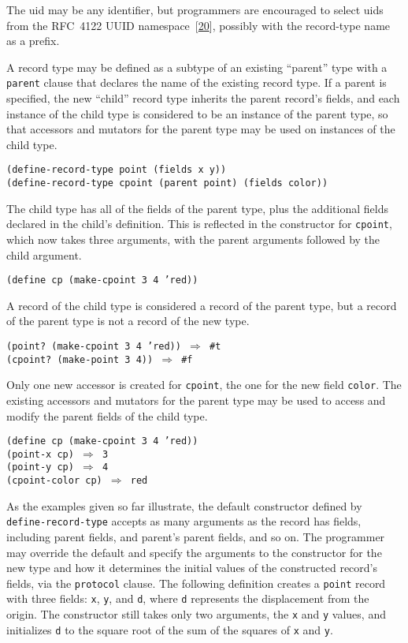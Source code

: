 The uid may be any identifier, but programmers are encouraged to select
uids from the RFC 4122 UUID namespace [\hyperref[bibliography_g238]{20}], possibly with the
record-type name as a prefix.


\label{records_s7}\label{records_s8}\label{records_s9}\label{records_s10}\label{records_page_parent_type}A record type may be defined as a subtype of an existing ``parent'' type
with a \texttt{parent} clause that declares the name of the existing
record type.
If a parent is specified, the new ``child'' record type inherits the
parent record's fields, and each instance of the child type is considered
to be an instance of the parent type, so that accessors and mutators for
the parent type may be used on instances of the child type.


\begin{alltt}
(define-record-type point (fields x y))
(define-record-type cpoint (parent point) (fields color))
\end{alltt}


The child type has all of the fields of the parent type, plus the additional
fields declared in the child's definition.
This is reflected in the constructor for \texttt{cpoint}, which now
takes three arguments, with the parent arguments followed by the
child argument.


\texttt{(define cp (make-cpoint 3 4 'red))}

A record of the child type is considered a record of the parent type, but
a record of the parent type is not a record of the new type.


\begin{alltt}
(point? (make-cpoint 3 4 'red)) \(\Rightarrow\) \#{}t
(cpoint? (make-point 3 4)) \(\Rightarrow\) \#{}f
\end{alltt}


Only one new accessor is created for \texttt{cpoint}, the one for the
new field \texttt{color}.
The existing accessors and mutators for the parent type may be used to
access and modify the parent fields of the child type.


\begin{alltt}
(define cp (make-cpoint 3 4 'red))
(point-x cp) \(\Rightarrow\) 3
(point-y cp) \(\Rightarrow\) 4
(cpoint-color cp) \(\Rightarrow\) red
\end{alltt}


\label{records_s11}\label{records_page_protocols}As the examples given so far illustrate,
the default constructor defined by \texttt{define-record-type}
accepts as many arguments as the record has fields, including parent
fields, and parent's parent fields, and so on.
The programmer may override the default and specify the arguments to the
constructor for the new type and how it determines the initial values of
the constructed record's fields, via the \texttt{protocol} clause.
The following definition creates a \texttt{point} record with three
fields: \texttt{x}, \texttt{y}, and \texttt{d}, where \texttt{d}
represents the displacement from the origin.
The constructor still takes only two arguments, the \texttt{x} and
\texttt{y} values, and initializes \texttt{d} to the square root
of the sum of the squares of \texttt{x} and \texttt{y}.


